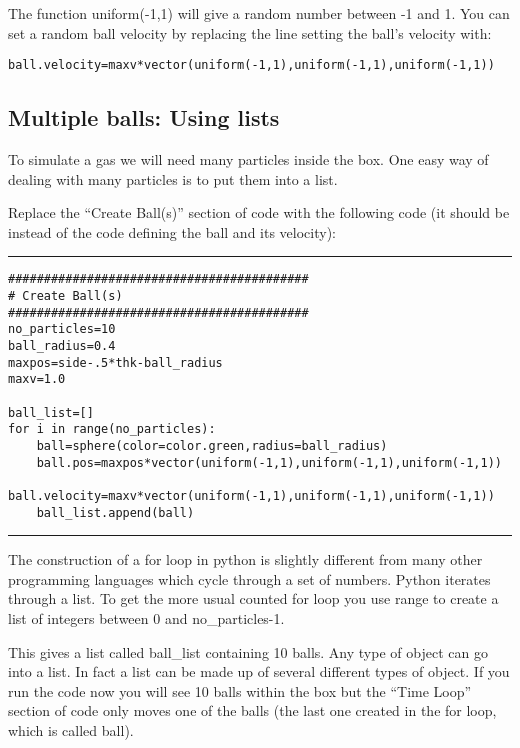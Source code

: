 \documentclass[12pt]{article}
\begin{document}
The function {\color{code}uniform(-1,1)} will give a random number between -1 and 1.
You can set a random ball velocity by replacing the line setting the ball's velocity with:
{\color{code}\begin{verbatim}
ball.velocity=maxv*vector(uniform(-1,1),uniform(-1,1),uniform(-1,1))
\end{verbatim}}


\subsection{Multiple balls: Using lists}
To simulate a gas we will need many particles inside the box.
One easy way of dealing with many particles is to put them into a list.

Replace the ``Create Ball(s)'' section of code with the following code
(it should be instead of the code defining the ball and its velocity):
{\color{code}\hrule
\begin{verbatim}
##########################################
# Create Ball(s)
##########################################
no_particles=10
ball_radius=0.4
maxpos=side-.5*thk-ball_radius
maxv=1.0

ball_list=[]
for i in range(no_particles):
    ball=sphere(color=color.green,radius=ball_radius)
    ball.pos=maxpos*vector(uniform(-1,1),uniform(-1,1),uniform(-1,1))
    ball.velocity=maxv*vector(uniform(-1,1),uniform(-1,1),uniform(-1,1))
    ball_list.append(ball)
\end{verbatim}\hrule}
The construction of a {\color{code}for} loop in python is slightly different from many
other programming languages which cycle through a set of numbers. Python iterates through a list.
To get the more usual counted for loop you use {\color{code}range}
to create a list of integers between 0 and {\color{code}no\_particles-1}.

This gives a list called {\color{code}ball\_list} containing 10 balls. Any type of object can go into a list.
In fact a list can be made up of several different types of object.
If you run the code now you will see 10 balls within the box but the ``Time Loop''
section of code only moves one of the balls (the last one created in the
{\color{code}for} loop, which is called {\color{code}ball}).
\end{document}
